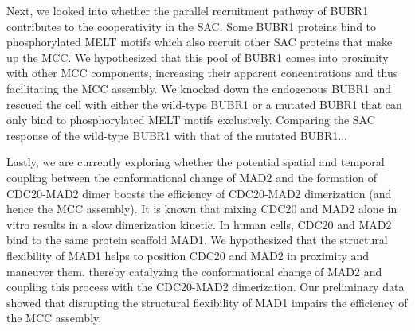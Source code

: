 Next, we looked into whether the parallel recruitment pathway of BUBR1 contributes to the cooperativity in the SAC. Some BUBR1 proteins bind to phosphorylated MELT motifs which also recruit other SAC proteins that make up the MCC. We hypothesized that this pool of BUBR1 comes into proximity with other MCC components, increasing their apparent concentrations and thus facilitating the MCC assembly. We knocked down the endogenous BUBR1 and rescued the cell with either the wild-type BUBR1 or a mutated BUBR1 that can only bind to phosphorylated MELT motifs exclusively. Comparing the SAC response of the wild-type BUBR1 with that of the mutated BUBR1...

Lastly, we are currently exploring whether the potential spatial and temporal coupling between the conformational change of MAD2 and the formation of CDC20-MAD2 dimer boosts the efficiency of CDC20-MAD2 dimerization (and hence the MCC assembly). It is known that mixing CDC20 and MAD2 alone in vitro results in a slow dimerization kinetic. In human cells, CDC20 and MAD2 bind to the same protein scaffold MAD1. We hypothesized that the structural flexibility of MAD1 helps to position CDC20 and MAD2 in proximity and maneuver them, thereby catalyzing the conformational change of MAD2 and coupling this process with the CDC20-MAD2 dimerization. Our preliminary data showed that disrupting the structural flexibility of MAD1 impairs the efficiency of the MCC assembly.